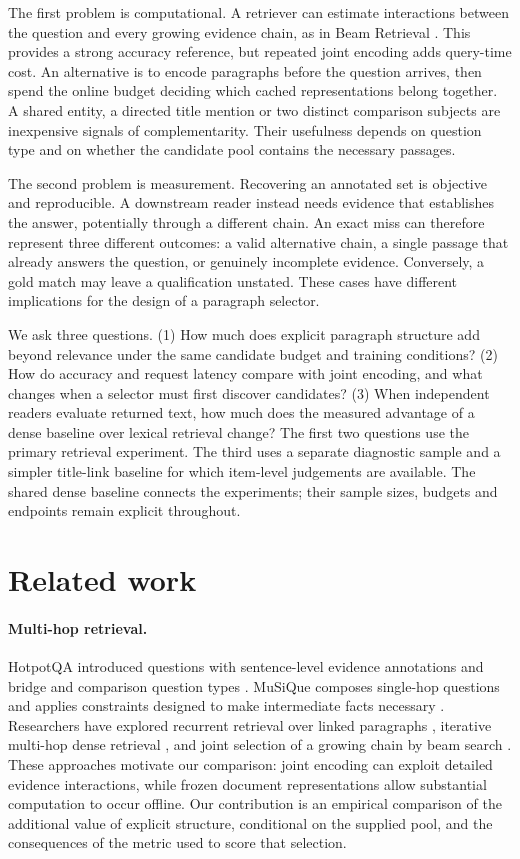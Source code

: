 \documentclass[twoside,a4paper,11pt]{article}
\begin{document}
The first problem is computational. A retriever can estimate interactions between the question and every growing evidence chain, as in Beam Retrieval \citep{beam}. This provides a strong accuracy reference, but repeated joint encoding adds query-time cost. An alternative is to encode paragraphs before the question arrives, then spend the online budget deciding which cached representations belong together. A shared entity, a directed title mention or two distinct comparison subjects are inexpensive signals of complementarity. Their usefulness depends on question type and on whether the candidate pool contains the necessary passages.

The second problem is measurement. Recovering an annotated set is objective and reproducible. A downstream reader instead needs evidence that establishes the answer, potentially through a different chain. An exact miss can therefore represent three different outcomes: a valid alternative chain, a single passage that already answers the question, or genuinely incomplete evidence. Conversely, a gold match may leave a qualification unstated. These cases have different implications for the design of a paragraph selector.

We ask three questions. (1) How much does explicit paragraph structure add beyond relevance under the same candidate budget and training conditions? (2) How do accuracy and request latency compare with joint encoding, and what changes when a selector must first discover candidates? (3) When independent readers evaluate returned text, how much does the measured advantage of a dense baseline over lexical retrieval change? The first two questions use the primary retrieval experiment. The third uses a separate diagnostic sample and a simpler title-link baseline for which item-level judgements are available. The shared dense baseline connects the experiments; their sample sizes, budgets and endpoints remain explicit throughout.

\section{Related work}
\paragraph{Multi-hop retrieval.}
HotpotQA introduced questions with sentence-level evidence annotations and bridge and comparison question types \citep{hotpot}. MuSiQue composes single-hop questions and applies constraints designed to make intermediate facts necessary \citep{musique}. Researchers have explored recurrent retrieval over linked paragraphs \citep{asai}, iterative multi-hop dense retrieval \citep{xiong}, and joint selection of a growing chain by beam search \citep{beam}. These approaches motivate our comparison: joint encoding can exploit detailed evidence interactions, while frozen document representations allow substantial computation to occur offline. Our contribution is an empirical comparison of the additional value of explicit structure, conditional on the supplied pool, and the consequences of the metric used to score that selection.
\end{document}
